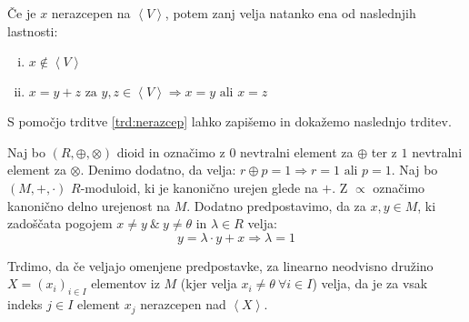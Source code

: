 \documentclass[mat1]{fmfdelo}
\newcommand{\Gen}[1]{\ensuremath{\left<{#1}\right>}}
\begin{document}
\begin{trditev}
	\label{trd:nerazcep}
	Če je $x$ nerazcepen na \Gen{V}, potem zanj velja natanko ena od naslednjih lastnosti:
	\begin{enumerate}[(i)] 
		\item $x \notin \Gen{V}$
		\item $x = y + z \text{~za~} y, z\in\Gen{V}\Rightarrow x = y \text{~ali~} x = z$
	\end{enumerate}
\end{trditev}

S pomočjo trditve \ref{trd:nerazcep} lahko zapišemo in dokažemo naslednjo trditev.

\begin{trditev}
	\label{trd:potrebzanerazcep}
	Naj bo $(R, \oplus, \otimes)$ dioid in označimo z $0$ nevtralni element za $\oplus$ ter z $1$ nevtralni element za $\otimes$. Denimo dodatno, da velja: $r\oplus p = 1 \Rightarrow r = 1 \text{~ali~} p=1$. 
	Naj bo $(M, +, \cdot)$ $R$-moduloid, ki je kanonično urejen glede na $+$. Z $\varpropto$ označimo kanonično delno urejenost na $M$. Dodatno predpostavimo, da za $x, y\in M$, ki zadoščata pogojem $x \neq y ~\&~ y\neq\theta$ in $\lambda\in R$ velja: $$y = \lambda\cdot y + x \Rightarrow \lambda = 1$$
	
	Trdimo, da če veljajo omenjene predpostavke, za linearno neodvisno družino $X = (x_i)_{i\in I}$ elementov iz $M$ (kjer velja $x_i \neq \theta~\forall i\in I$) velja, da je za vsak indeks $j\in I$ element $x_j$ nerazcepen nad \Gen{X}.
\end{trditev}
\end{document}
